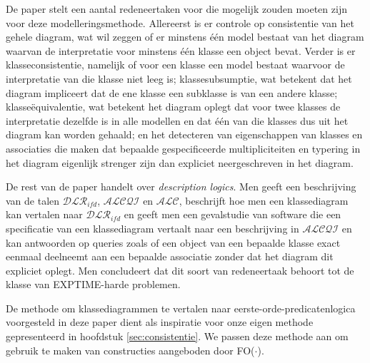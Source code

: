 De paper stelt een aantal redeneertaken voor die mogelijk zouden moeten zijn voor deze modelleringsmethode. Allereerst is er controle op consistentie van het gehele diagram, wat wil zeggen of er minstens \'e\'en model bestaat van het diagram waarvan de interpretatie voor minstens \'e\'en klasse een object bevat. Verder is er klasseconsistentie, namelijk of voor een klasse een model bestaat waarvoor de interpretatie van die klasse niet leeg is; klassesubsumptie, wat betekent dat het diagram impliceert dat de ene klasse een subklasse is van een andere klasse; klasse\"equivalentie, wat betekent het diagram oplegt dat voor twee klasses de interpretatie dezelfde is in alle modellen en dat \'e\'en van die klasses dus uit het diagram kan worden gehaald; en het detecteren van eigenschappen van klasses en associaties die maken dat bepaalde gespecificeerde multipliciteiten en typering in het diagram eigenlijk strenger zijn dan expliciet neergeschreven in het diagram.

De rest van de paper handelt over \textit{description logics}. Men geeft een beschrijving van de talen $\mathcal{DLR}_{ifd}$, $\mathcal{ALCQI}$ en $\mathcal{ALC}$, beschrijft hoe men een klassediagram kan vertalen naar $\mathcal{DLR}_{ifd}$ en geeft men een gevalstudie van software die een specificatie van een klassediagram vertaalt naar een beschrijving in $\mathcal{ALCQI}$ en kan antwoorden op queries zoals of een object van een bepaalde klasse exact eenmaal deelneemt aan een bepaalde associatie zonder dat het diagram dit expliciet oplegt. Men concludeert dat dit soort van redeneertaak behoort tot de klasse van EXPTIME-harde problemen.

De methode om klassediagrammen te vertalen naar eerste-orde-predicatenlogica voorgesteld in deze paper dient als inspiratie voor onze eigen methode gepresenteerd in hoofdstuk \ref{sec:consistentie}. We passen deze methode aan om gebruik te maken van constructies aangeboden door FO($\cdot$)\cite{DeCatBroes2014PLaa}.

